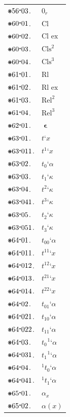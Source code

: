 \documentclass[12pt,openany,leqno,twocolumn]{book}
\newcommand{\pmast}{\text{\resizebox{!}{.75\height}{\ding{107}}}} %
\newcommand{\pmcdot}{\text{\raisebox{.05cm}{$\boldsymbol\cdot$}}} %
\newcommand{\pmClsn}[1]{\text{Cls}^{#1}}
\newcommand{\pmorn}[1]{#1_r} %
\newcommand{\pmsCl}{\text{Cl}}
\newcommand{\pmsCle}{\text{Cl ex}}
\newcommand{\pmsRl}{\text{Rl}}
\newcommand{\pmsRle}{\text{Rl ex}}
\newcommand{\pmReln}[1]{\text{Rel}^{#1}} %
\newcommand{\pmrin}{\mathop{\boldsymbol{\epsilon}}} %
\newcommand{\pmrt}[1]{t\textbf{`}#1} %
\newcommand{\pmrti}[2]{t^{#1}\textbf{`}#2} %
\newcommand{\pmrtc}[2]{t_{#1}\textbf{`}#2} %
\newcommand{\pmrtri}[2]{t^{#1}\textbf{`}#2} %
\newcommand{\pmrtrc}[2]{t_{#1}\textbf{`}#2} %
\newcommand{\pmrtrci}[3]{t_{#1}^{\text{ }#2}\textbf{`}#3} %
\newcommand{\pmrtric}[3]{{}^{#1}t_{#2}\textbf{`}#3} %
\newcommand{\pmrtdi}[2]{#1_{#2}} %
\newcommand{\pmrtdc}[2]{#1(#2)} %
\begin{document}
\begin{tabular}{l l}
$\pmast56\pmcdot03$. & $\pmorn{0}$ \\
$\pmast60\pmcdot01$. & $\pmsCl$ \\
$\pmast60\pmcdot02$. & $\pmsCle$ \\
$\pmast60\pmcdot03$. & $\pmClsn{2}$ \\
$\pmast60\pmcdot04$. & $\pmClsn{3}$ \\
$\pmast61\pmcdot01$. & $\pmsRl$ \\
$\pmast61\pmcdot02$. & $\pmsRle$ \\
$\pmast61\pmcdot03$. & $\pmReln{2}$ \\
$\pmast61\pmcdot04$. & $\pmReln{3}$ \\
$\pmast62\pmcdot01$. & $\pmrin$ \\
$\pmast63\pmcdot01$. & $\pmrt{x}$ \\
$\pmast63\pmcdot011$. & $\pmrti{1}{x}$ \\
$\pmast63\pmcdot02$. & $\pmrtc{0}{\alpha}$ \\
$\pmast63\pmcdot03$. & $\pmrtc{1}{\kappa}$ \\
$\pmast63\pmcdot04$. & $\pmrti{2}{\kappa}$ \\
$\pmast63\pmcdot041$. & $\pmrti{3}{\kappa}$ \\
$\pmast63\pmcdot05$. & $\pmrtc{2}{\kappa}$ \\
$\pmast63\pmcdot051$. & $\pmrtc{3}{\kappa}$ \\
$\pmast64\pmcdot01$. & $\pmrtrc{00}{\alpha}$ \\
$\pmast64\pmcdot011$. & $\pmrtri{11}{x}$ \\
$\pmast64\pmcdot012$. & $\pmrti{12}{x}$ \\
$\pmast64\pmcdot013$. & $\pmrti{21}{x}$ \\
$\pmast64\pmcdot014$. & $\pmrti{22}{x}$ \\
$\pmast64\pmcdot02$. & $\pmrtc{01}{\alpha}$ \\
$\pmast64\pmcdot021$. & $\pmrtc{10}{\alpha}$ \\
$\pmast64\pmcdot022$. & $\pmrtc{11}{\alpha}$ \\
$\pmast64\pmcdot03$. & $\pmrtrci{0}{1}{\alpha}$ \\
$\pmast64\pmcdot031$. & $\pmrtrci{1}{1}{\alpha}$ \\
$\pmast64\pmcdot04$. & $\pmrtric{1}{0}{\alpha}$ \\
$\pmast64\pmcdot041$. & $\pmrtric{1}{1}{\alpha}$ \\
$\pmast65\pmcdot01$. & $\pmrtdi{\alpha}{x}$ \\
$\pmast65\pmcdot02$. & $\pmrtdc{\alpha}{x}$ 
\end{tabular}
\end{document}
